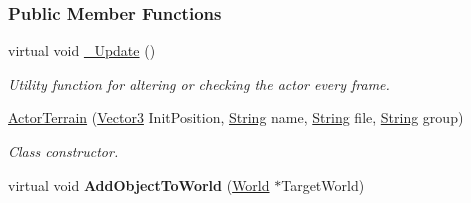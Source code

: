 \subsubsection*{Public Member Functions}
\begin{DoxyCompactItemize}
\item 
\hypertarget{classMezzanine_1_1ActorTerrain_a89a10fcace9b67b58ca0ab46fb335a19}{
virtual void \hyperlink{classMezzanine_1_1ActorTerrain_a89a10fcace9b67b58ca0ab46fb335a19}{\_\-Update} ()}
\label{classMezzanine_1_1ActorTerrain_a89a10fcace9b67b58ca0ab46fb335a19}

\begin{DoxyCompactList}\small\item\em Utility function for altering or checking the actor every frame. \item\end{DoxyCompactList}\item 
\hyperlink{classMezzanine_1_1ActorTerrain_aed127b452b96d0c2d75b8d6f0640608a}{ActorTerrain} (\hyperlink{classMezzanine_1_1Vector3}{Vector3} InitPosition, \hyperlink{namespaceMezzanine_acf9fcc130e6ebf08e3d8491aebcf1c86}{String} name, \hyperlink{namespaceMezzanine_acf9fcc130e6ebf08e3d8491aebcf1c86}{String} file, \hyperlink{namespaceMezzanine_acf9fcc130e6ebf08e3d8491aebcf1c86}{String} group)
\begin{DoxyCompactList}\small\item\em Class constructor. \item\end{DoxyCompactList}\item 
\hypertarget{classMezzanine_1_1ActorTerrain_a4f072287040387d4484b0be5ab861ab6}{
virtual void {\bfseries AddObjectToWorld} (\hyperlink{classMezzanine_1_1World}{World} $\ast$TargetWorld)}
\label{classMezzanine_1_1ActorTerrain_a4f072287040387d4484b0be5ab861ab6}


\end{DoxyCompactItemize}
